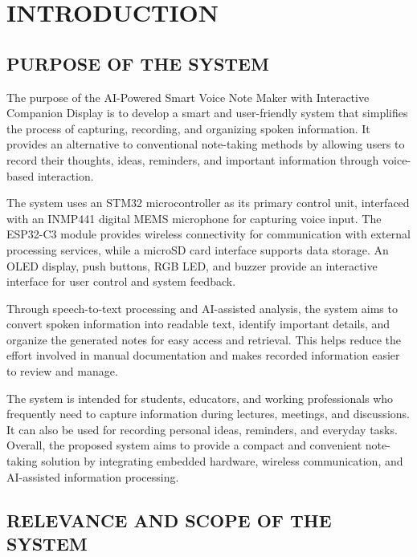\documentclass[a4paper,12pt,oneside]{report}
\begin{document}
\clearpage
{}
\setcounter{page}{1}

\chapter{INTRODUCTION}


\section{PURPOSE OF THE SYSTEM}


\setlength{\parindent}{0pt}
\setlength{\parskip}{6pt}

\noindent
The purpose of the AI-Powered Smart Voice Note Maker with Interactive Companion Display is to develop a smart and user-friendly system that simplifies the process of capturing, recording, and organizing spoken information. It provides an alternative to conventional note-taking methods by allowing users to record their thoughts, ideas, reminders, and important information through voice-based interaction.

\noindent
The system uses an STM32 microcontroller as its primary control unit, interfaced with an INMP441 digital MEMS microphone for capturing voice input. The ESP32-C3 module provides wireless connectivity for communication with external processing services, while a microSD card interface supports data storage. An OLED display, push buttons, RGB LED, and buzzer provide an interactive interface for user control and system feedback.

\noindent
Through speech-to-text processing and AI-assisted analysis, the system aims to convert spoken information into readable text, identify important details, and organize the generated notes for easy access and retrieval. This helps reduce the effort involved in manual documentation and makes recorded information easier to review and manage.

\noindent
The system is intended for students, educators, and working professionals who frequently need to capture information during lectures, meetings, and discussions. It can also be used for recording personal ideas, reminders, and everyday tasks. Overall, the proposed system aims to provide a compact and convenient note-taking solution by integrating embedded hardware, wireless communication, and AI-assisted information processing.


\section{RELEVANCE AND SCOPE OF THE SYSTEM}
\end{document}
